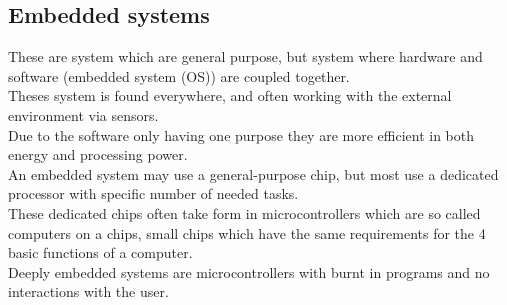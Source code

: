 \documentclass[12pt, a4paper]{article}
\begin{document}
		\subsection{Embedded systems}
			These are system which are general purpose, but system where hardware and software (embedded system (OS)) are coupled together.\\
			Theses system is found everywhere, and often working with the external environment via sensors.\\
			Due to the software only having one purpose they are more efficient in both energy and processing power.\\
			An embedded system may use a general-purpose chip, but most use a dedicated processor with specific number of needed tasks.\\
			These dedicated chips often take form in microcontrollers which are so called computers on a chips, small chips which have the same requirements for the 4 basic functions of a computer.\\
			Deeply embedded systems are microcontrollers with burnt in programs and no interactions with the user.
\end{document}
